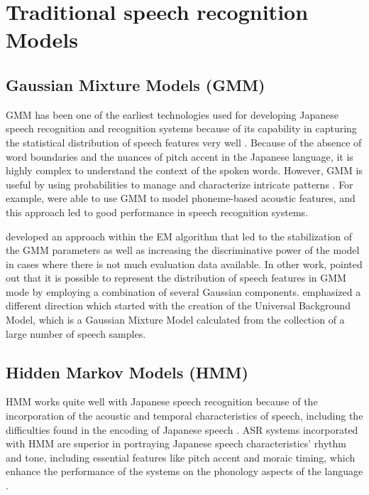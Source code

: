 \section{Traditional speech recognition Models}

\subsection{Gaussian Mixture Models (GMM)}
GMM has been one of the earliest technologies used for developing Japanese speech recognition and recognition systems because of its capability in capturing the statistical distribution of speech features very well \parencite{Imaishi2022Examination}. Because of the absence of word boundaries and the nuances of pitch accent in the Japanese language, it is highly complex to understand the context of the spoken words. However, GMM is useful by using probabilities to manage and characterize intricate patterns \parencite{sun2020subspace}. For example, \textcite{povey2011subspace} were able to use GMM to model phoneme-based acoustic features, and this approach led to good performance in speech recognition systems.

\textcite{Imaishi2022Examination} developed an approach within the EM algorithm that led to the stabilization of the GMM parameters as well as increasing the discriminative power of the model in cases where there is not much evaluation data available. In other work, \textcite{povey2011subspace} pointed out that it is possible to represent the distribution of speech features in GMM mode by employing a combination of several Gaussian components. \textcite{Takami2020Performance} emphasized a different direction which started with the creation of the Universal Background Model, which is a Gaussian Mixture Model calculated from the collection of a large number of speech samples.

\subsection{Hidden Markov Models (HMM)}
HMM works quite well with Japanese speech recognition because of the incorporation of the acoustic and temporal characteristics of speech, including the difficulties found in the encoding of Japanese speech \parencite{Tokuda1999Application}. ASR systems incorporated with HMM are superior in portraying Japanese speech characteristics' rhythm and tone, including essential features like pitch accent and moraic timing, which enhance the performance of the systems on the phonology aspects of the language \parencite{Tokuda2000HMM}.

